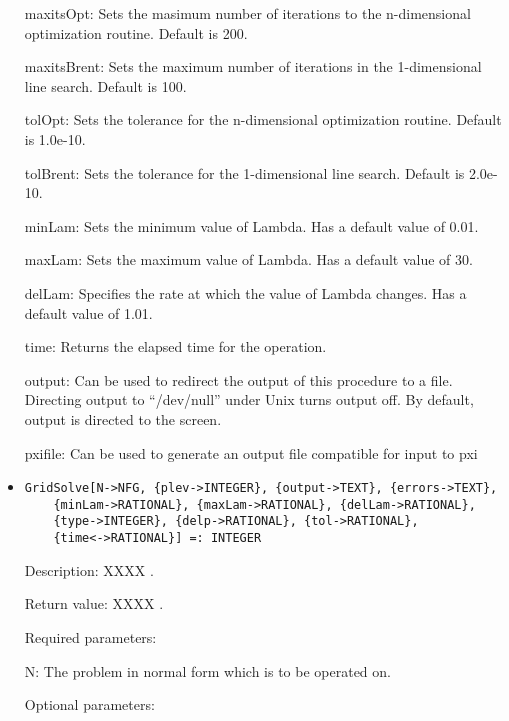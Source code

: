 \begin{itemize}
\item
[ maxitsOpt:] Sets the masimum number of iterations to the 
n-dimensional optimization routine.  Default is 200.
\item
[ maxitsBrent:] Sets the maximum number of iterations in
the 1-dimensional line search.  Default is 100.
\item
[ tolOpt:] Sets the tolerance for the n-dimensional
optimization routine.  Default is 1.0e-10.
\item
[ tolBrent:] Sets the tolerance for the 1-dimensional line
search.  Default is 2.0e-10.
\item
[ minLam:] Sets the minimum value of Lambda.  Has a default value of 0.01.
\item
[ maxLam:] Sets the maximum value of Lambda.  Has a default value of 30.
\item
[ delLam:] Specifies the rate at which the value of Lambda changes. Has a default value of 1.01.
\item
[ time:] Returns the elapsed time for the operation.
\item
[ output:] Can be used to redirect the output of this procedure to a
file.  Directing output to ``/dev/null'' under Unix turns output off.
By default, output is directed to the screen.
\item
[ pxifile:]Can be used to generate an output file
compatible for input to pxi
\ed
\ed

\item
\protect \large \begin{verbatim}
GridSolve[N->NFG, {plev->INTEGER}, {output->TEXT}, {errors->TEXT}, 
	{minLam->RATIONAL}, {maxLam->RATIONAL}, {delLam->RATIONAL}, 
	{type->INTEGER}, {delp->RATIONAL}, {tol->RATIONAL}, 
	{time<->RATIONAL}] =: INTEGER
\end{verbatim}\normalsize

\bd
\item
[Description:] XXXX .
\item
[Return value:] XXXX .
\item
[Required parameters:]\hfil\null
	
\bd
\item  
[ N:] The problem in normal form which is to be operated on.
\ed

\item
[Optional parameters:]\hfil\null


\end{itemize}
